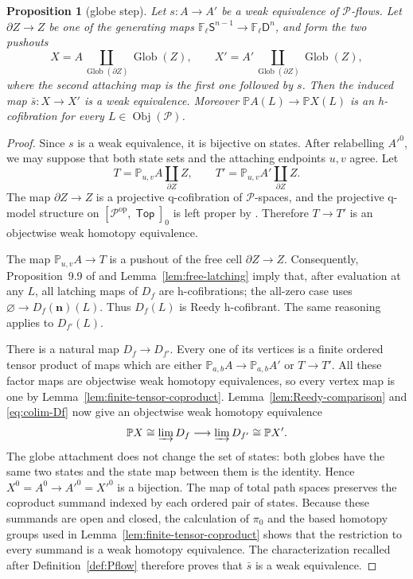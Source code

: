 \documentclass[12pt,a4paper]{amsart}
\newcommand{\Top}{\mathop{\mathsf{Top}}}
\newcommand{\Pcat}{\mathcal P}
\newcommand{\PSp}{[\Pcat^{\mathrm{op}},\Top]_0}
\newcommand{\Path}{\mathbb P}
\newcommand{\Ffree}{\mathbb F}
\newcommand{\Obj}{\operatorname{Obj}}
\newcommand{\liminj}{\varinjlim}
\newtheorem{proposition}[thm]{Proposition}
\theoremstyle{definition}
\begin{document}
\begin{proposition}[globe step]\label{prop:globe-step}
Let \(s: A\to A'\) be a weak equivalence of \(\Pcat\)-flows.  Let \(\partial Z\to Z\) be one of the generating maps \(\Ffree_\ell \mathsf{S}^{n-1}\to\Ffree_\ell \mathsf{D}^n\), and form the two pushouts
\[
 X=A\mathop{\coprod}_{\operatorname{Glob}(\partial Z)}
       \operatorname{Glob}(Z),
 \qquad
 X'=A'\mathop{\coprod}_{\operatorname{Glob}(\partial Z)}
       \operatorname{Glob}(Z),
\]
where the second attaching map is the first one followed by \(s\).  Then the induced map \(\bar s: X\to X'\) is a weak equivalence.  Moreover \(\Path A(L)\to\Path X(L)\) is an h-cofibration for every \(L\in\Obj(\Pcat)\).
\end{proposition}

\begin{proof}
Since \(s\) is a weak equivalence, it is bijective on states.  After relabelling \(A'^0\), we may suppose that both state sets and the attaching endpoints \(u,v\) agree.  Let
\[
 T=\Path_{u,v}A\mathop{\coprod}_{\partial Z}Z,
 \qquad
 T'=\Path_{u,v}A'\mathop{\coprod}_{\partial Z}Z.
\]
The map \(\partial Z\to Z\) is a projective q-cofibration of \(\Pcat\)-spaces, and the projective q-model structure on \(\PSp\) is left proper by \cite[Corollary~6.5]{dgrtop}.  Therefore \(T\to T'\) is an objectwise weak homotopy equivalence.

The map \(\Path_{u,v}A\to T\) is a pushout of the free cell \(\partial Z\to Z\).  Consequently, Proposition~9.9 of \cite{Moore1} and Lemma~\ref{lem:free-latching} imply that, after evaluation at any \(L\), all latching maps of \(D_f\) are h-cofibrations; the all-zero case uses \(\varnothing\to D_f(\mathbf n)(L)\).  Thus \(D_f(L)\) is Reedy h-cofibrant. The same reasoning applies to \(D_{f'}(L)\).

There is a natural map \(D_f\to D_{f'}\).  Every one of its vertices is a finite ordered tensor product of maps which are either \(\Path_{a,b}A\to\Path_{a,b}A'\) or \(T\to T'\).  All these factor maps are objectwise weak homotopy equivalences, so every vertex map is one by Lemma~\ref{lem:finite-tensor-coproduct}.  Lemma~\ref{lem:Reedy-comparison} and \eqref{eq:colim-Df} now give an objectwise weak homotopy equivalence
\[
 \Path X\cong\liminj D_f\longrightarrow
 \liminj D_{f'}\cong\Path X'.
\]
The globe attachment does not change the set of states: both globes have the same two states and the state map between them is the identity.  Hence \(X^0=A^0\to A'^0=X'^0\) is a bijection.  The map of total path spaces preserves the coproduct summand indexed by each ordered pair of states. Because these summands are open and closed, the calculation of \(\pi_0\) and the based homotopy groups used in Lemma~\ref{lem:finite-tensor-coproduct} shows that the restriction to every summand is a weak homotopy equivalence.  The characterization recalled after Definition~\ref{def:Pflow} therefore proves that \(\bar s\) is a weak equivalence.


\end{proof}
\end{document}
